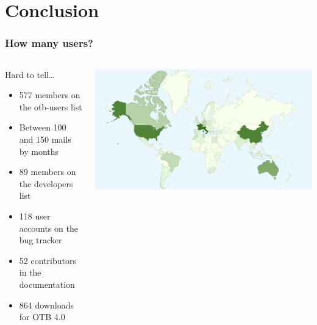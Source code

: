 \documentclass[8pt]{beamer}
\begin{document}
\section{Conclusion}
\begin{frame}
\frametitle{How many users?}
\begin{columns}[c]
\begin{block}{Hard to tell\ldots}
\begin{itemize}
    \item 577 members on the otb-users list
    \item Between 100 and 150 mails by months
    \item 89 members on the developers list
    \item 118 user accounts on the bug tracker
    \item 52 contributors in the documentation
    \item 864 downloads for OTB 4.0
  \end{itemize}
\end{block}
\includegraphics[width=\textwidth]{images/OTB4_download_sourceforge_country_crop.png}
\end{columns}
\end{frame}
\end{document}
